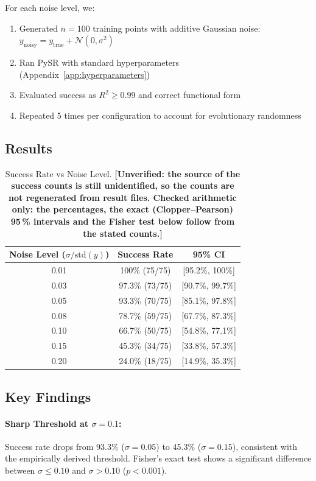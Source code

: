 \documentclass[twoside,11pt]{article}
\begin{document}
For each noise level, we:
\begin{enumerate}
\item Generated $n = 100$ training points with additive Gaussian noise: $y_{\text{noisy}} = y_{\text{true}} + \mathcal{N}(0, \sigma^2)$
\item Ran PySR with standard hyperparameters (Appendix~\ref{app:hyperparameters})
\item Evaluated success as $R^2 \geq 0.99$ and correct functional form
\item Repeated 5 times per configuration to account for evolutionary randomness
\end{enumerate}

\subsection{Results}

\begin{table}[H]
\centering
\caption{Success Rate vs Noise Level.
  \textbf{[Unverified: the source of the success counts is still unidentified, so the counts are not regenerated from result files. Checked arithmetic only: the percentages, the exact (Clopper--Pearson) 95\,\% intervals and the Fisher test below follow from the stated counts.]}}
\label{tab:noise_sensitivity}
\begin{tabular}{@{}ccc@{}}
\toprule
\textbf{Noise Level ($\sigma / \text{std}(y)$)} & \textbf{Success Rate} & \textbf{95\% CI} \\
\midrule
0.01 & 100\% (75/75) & [95.2\%, 100\%] \\
0.03 & 97.3\% (73/75) & [90.7\%, 99.7\%] \\
0.05 & 93.3\% (70/75) & [85.1\%, 97.8\%] \\
0.08 & 78.7\% (59/75) & [67.7\%, 87.3\%] \\
0.10 & 66.7\% (50/75) & [54.8\%, 77.1\%] \\
0.15 & 45.3\% (34/75) & [33.8\%, 57.3\%] \\
0.20 & 24.0\% (18/75) & [14.9\%, 35.3\%] \\
\bottomrule
\end{tabular}
\end{table}

\subsection{Key Findings}

\paragraph{Sharp Threshold at $\sigma = 0.1$:}
Success rate drops from 93.3\% ($\sigma = 0.05$) to 45.3\% ($\sigma = 0.15$), consistent with the empirically derived threshold. Fisher's exact test shows a significant difference between $\sigma \leq 0.10$ and $\sigma > 0.10$ ($p < 0.001$).
\end{document}
